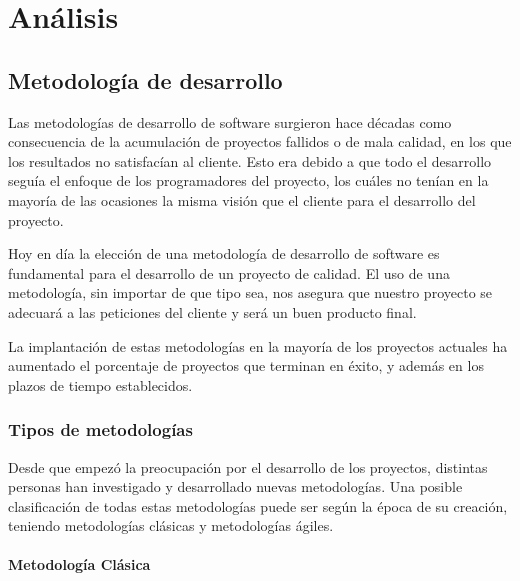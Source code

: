 \chapter{Análisis}


\section{Metodología de desarrollo}

Las metodologías de desarrollo de software surgieron hace décadas como consecuencia de la acumulación de proyectos fallidos o de mala calidad, en los que los resultados no satisfacían al cliente. Esto era debido a que todo el desarrollo seguía el enfoque de los programadores del proyecto, los cuáles no tenían en la mayoría de las ocasiones la misma visión que el cliente para el desarrollo del proyecto.

Hoy en día la elección de una metodología de desarrollo de software es fundamental para el desarrollo de un proyecto de calidad. El uso de una metodología, sin importar de que tipo sea, nos asegura que nuestro proyecto se adecuará a las peticiones del cliente y será un buen producto final.

La implantación de estas metodologías en la mayoría de los proyectos actuales ha aumentado el porcentaje de proyectos que terminan en éxito, y además en los plazos de tiempo establecidos.


\subsection{Tipos de metodologías}

Desde que empezó la preocupación por el desarrollo de los proyectos, distintas personas han investigado y desarrollado nuevas metodologías. Una posible clasificación de todas estas metodologías puede ser según la época de su creación, teniendo metodologías clásicas y metodologías ágiles.

\subsubsection{Metodología Clásica}

